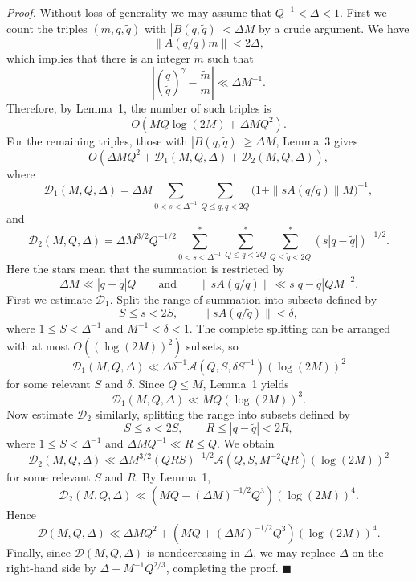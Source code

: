 \documentclass[10pt]{article}
\begin{document}
\medskip
\noindent\textit{Proof.}
Without loss of generality we may assume that $Q^{-1}<\Delta<1$. First we
count the triples $(m,q,\widetilde q)$ with
$|B(q,\widetilde q)|<\Delta M$ by a crude argument. We have
\[
  \|A(q/\widetilde q)m\|<2\Delta,
\]
which implies that there is an integer $\widetilde m$ such that
\[
  \left|\left(\frac q{\widetilde q}\right)^\gamma
        -\frac{\widetilde m}{m}\right|\ll\Delta M^{-1}.
\]
Therefore, by Lemma~1, the number of such triples is
\[
  O\left(MQ\log(2M)+\Delta MQ^2\right).
\]
For the remaining triples, those with
$|B(q,\widetilde q)|\ge\Delta M$, Lemma~3 gives
\[
  O\left(\Delta MQ^2+\mathscr D_1(M,Q,\Delta)
                  +\mathscr D_2(M,Q,\Delta)\right),
\]
where
\[
  \mathscr D_1(M,Q,\Delta)
  =\Delta M\sum_{0<s<\Delta^{-1}}
    \sum_{Q\le q,\widetilde q<2Q}
    \bigl(1+\|sA(q/\widetilde q)\|M\bigr)^{-1},
\]
and
\[
  \mathscr D_2(M,Q,\Delta)
  =\Delta M^{3/2}Q^{-1/2}
  \sum_{0<s<\Delta^{-1}}^{*}
  \sum_{Q\le q<2Q}^{*}\sum_{Q\le\widetilde q<2Q}^{*}
  (s|q-\widetilde q|)^{-1/2}.
\]
Here the stars mean that the summation is restricted by
\[
  \Delta M\ll |q-\widetilde q|Q
  \qquad\text{and}\qquad
  \|sA(q/\widetilde q)\|\ll s|q-\widetilde q|QM^{-2}.
\]
First we estimate $\mathscr D_1$. Split the range of summation into
subsets defined by
\[
  S\le s<2S,
  \qquad
  \|sA(q/\widetilde q)\|<\delta,
\]
where $1\le S<\Delta^{-1}$ and $M^{-1}<\delta<1$. The complete splitting
can be arranged with at most $O((\log(2M))^2)$ subsets, so
\[
  \mathscr D_1(M,Q,\Delta)
  \ll \Delta\delta^{-1}\mathscr A(Q,S,\delta S^{-1})
       (\log(2M))^2
\]
for some relevant $S$ and $\delta$. Since $Q\le M$, Lemma~1 yields
\[
  \mathscr D_1(M,Q,\Delta)\ll MQ(\log(2M))^3.
\]
Now estimate $\mathscr D_2$ similarly, splitting the range into subsets
defined by
\[
  S\le s<2S,
  \qquad
  R\le|q-\widetilde q|<2R,
\]
where $1\le S<\Delta^{-1}$ and
$\Delta MQ^{-1}\ll R\le Q$. We obtain
\[
  \mathscr D_2(M,Q,\Delta)
  \ll \Delta M^{3/2}(QRS)^{-1/2}
       \mathscr A(Q,S,M^{-2}QR)(\log(2M))^2
\]
for some relevant $S$ and $R$. By Lemma~1,
\[
  \mathscr D_2(M,Q,\Delta)
  \ll\left(MQ+(\Delta M)^{-1/2}Q^3\right)(\log(2M))^4.
\]
Hence
\[
  \mathscr D(M,Q,\Delta)
  \ll \Delta MQ^2+
  \left(MQ+(\Delta M)^{-1/2}Q^3\right)(\log(2M))^4.
\]
Finally, since $\mathscr D(M,Q,\Delta)$ is nondecreasing in $\Delta$, we
may replace $\Delta$ on the right-hand side by
$\Delta+M^{-1}Q^{2/3}$, completing the proof. \(\blacksquare\)
\end{document}
